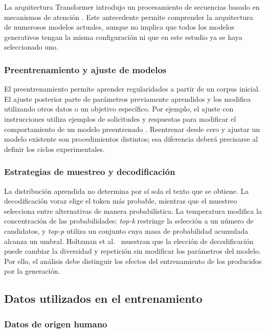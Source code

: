 \documentclass[12pt,letterpaper]{article}
\begin{document}
La arquitectura Transformer introdujo un procesamiento de secuencias basado
en mecanismos de atención \cite{vaswani2017}. Este antecedente permite
comprender la arquitectura de numerosos modelos actuales, aunque no implica
que todos los modelos generativos tengan la misma configuración ni que en
este estudio ya se haya seleccionado uno.

\subsubsection{Preentrenamiento y ajuste de modelos}

El preentrenamiento permite aprender regularidades a partir de un corpus
inicial. El ajuste posterior parte de parámetros previamente aprendidos y
los modifica utilizando otros datos o un objetivo específico. Por ejemplo,
el ajuste con instrucciones utiliza ejemplos de solicitudes y respuestas
para modificar el comportamiento de un modelo preentrenado
\cite{wang2023selfinstruct}. Reentrenar desde cero y ajustar un modelo
existente son procedimientos distintos; esa diferencia deberá precisarse
al definir los ciclos experimentales.

\subsubsection{Estrategias de muestreo y decodificación}

La distribución aprendida no determina por sí sola el texto que se obtiene.
La decodificación voraz elige el token más probable, mientras que el muestreo
selecciona entre alternativas de manera probabilística. La temperatura
modifica la concentración de las probabilidades; \textit{top-k} restringe
la selección a un número de candidatos, y \textit{top-p} utiliza un conjunto
cuya masa de probabilidad acumulada alcanza un umbral. Holtzman et al.\
\cite{holtzman2020} muestran que la elección de decodificación puede cambiar
la diversidad y repetición sin modificar los parámetros del modelo.
Por ello, el análisis debe distinguir los efectos del entrenamiento de los
producidos por la generación.

\subsection{Datos utilizados en el entrenamiento}

\subsubsection{Datos de origen humano}
\end{document}
